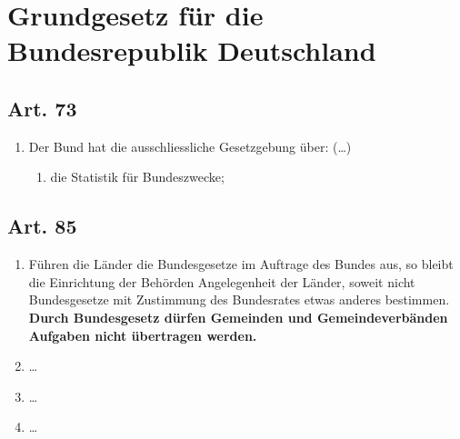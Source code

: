 \chapter[GG]{Grundgesetz für die Bundesrepublik Deutschland}
    \section{Art. 73}
        \begin{enumerate}[label=(\arabic*)]
            \item Der Bund hat die ausschliessliche Gesetzgebung über:
            \newline
            (\dots)
                \begin{enumerate}[label=\arabic*.,start=11]
                    \item  die Statistik für Bundeszwecke;
                \end{enumerate}

            
        \end{enumerate}
    \section{Art. 85}
        \begin{enumerate}[label=(\arabic*)]
            \item Führen die Länder die Bundesgesetze im Auftrage des Bundes aus, so bleibt die Einrichtung der Behörden Angelegenheit der Länder, soweit nicht Bundesgesetze mit Zustimmung des Bundesrates etwas anderes bestimmen. \textbf{Durch Bundesgesetz dürfen Gemeinden und Gemeindeverbänden Aufgaben nicht übertragen werden.}
            \item \dots
            \item \dots
            \item \dots
        \end{enumerate}